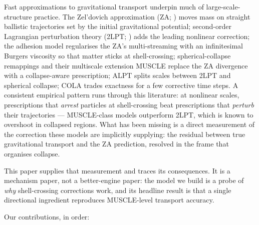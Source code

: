 \documentclass[11pt]{article}
\begin{document}
Fast approximations to gravitational transport underpin much of large-scale-structure practice. The Zel'dovich approximation (ZA; \cite{zeldovich1970}) moves mass on straight ballistic trajectories set by the initial gravitational potential; second-order Lagrangian perturbation theory (2LPT; \cite{bouchet1995,scoccimarro1998}) adds the leading nonlinear correction; the adhesion model \cite{gurbatov1989} regularises the ZA's multi-streaming with an infinitesimal Burgers viscosity so that matter sticks at shell-crossing; spherical-collapse remappings and their multiscale extension MUSCLE \cite{neyrinck2013,neyrinck2016} replace the ZA divergence with a collapse-aware prescription; ALPT \cite{kitaura2013} splits scales between 2LPT and spherical collapse; COLA \cite{tassev2013} trades exactness for a few corrective time steps. A consistent empirical pattern runs through this literature: at nonlinear scales, prescriptions that \emph{arrest} particles at shell-crossing beat prescriptions that \emph{perturb} their trajectories --- MUSCLE-class models outperform 2LPT, which is known to overshoot in collapsed regions. What has been missing is a direct measurement of the correction these models are implicitly supplying: the residual between true gravitational transport and the ZA prediction, resolved in the frame that organises collapse.

This paper supplies that measurement and traces its consequences. It is a mechanism paper, not a better-engine paper: the model we build is a probe of \emph{why} shell-crossing corrections work, and its headline result is that a single directional ingredient reproduces MUSCLE-level transport accuracy.

Our contributions, in order:
\end{document}
